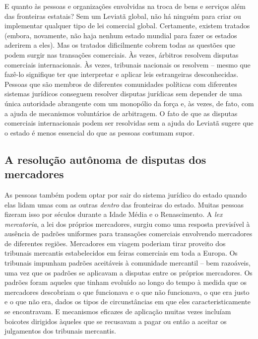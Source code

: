 E quanto às pessoas e organizações envolvidas na troca de bens e serviços além das fronteiras estatais? Sem um Leviatã global, não há ninguém para criar ou implementar qualquer tipo de lei comercial global. Certamente, existem tratados (embora, novamente, não haja nenhum estado mundial para fazer os estados aderirem a eles). Mas os tratados dificilmente cobrem todas as questões que podem surgir nas transações comerciais. Às vezes, árbitros resolvem disputas comerciais internacionais. Às vezes, tribunais nacionais os resolvem -- mesmo que fazê-lo signifique ter que interpretar e aplicar leis estrangeiras desconhecidas. Pessoas que são membros de diferentes comunidades políticas com diferentes sistemas jurídicos conseguem resolver disputas jurídicas sem depender de uma única autoridade abrangente com um monopólio da força e, às vezes, de fato, com a ajuda de mecanismos voluntários de arbitragem. O fato de que as disputas comerciais internacionais podem ser resolvidas sem a ajuda do Leviatã sugere que o estado é menos essencial do que as pessoas costumam supor.

\subsection*{A resolução autônoma de disputas dos mercadores}

As pessoas também podem optar por sair do sistema jurídico do estado quando elas lidam umas com as outras \emph{dentro} das fronteiras do estado. Muitas pessoas fizeram isso por séculos durante a Idade Média e o Renascimento. A \emph{lex mercatoria}, a lei dos próprios mercadores, surgiu como uma resposta previsível à ausência de padrões uniformes para transações comerciais envolvendo mercadores de diferentes regiões. Mercadores em viagem poderiam tirar proveito dos tribunais mercantis estabelecidos em feiras comerciais em toda a Europa. Os tribunais impunham padrões aceitáveis à comunidade mercantil -- bem razoáveis, uma vez que os padrões se aplicavam a disputas entre os próprios mercadores. Os padrões foram aqueles que tinham evoluído ao longo do tempo à medida que os mercadores descobriam o que funcionava e o que não funcionava, o que era justo e o que não era, dados os tipos de circunstâncias em que eles caracteristicamente se encontravam. E mecanismos eficazes de aplicação muitas vezes incluíam boicotes dirigidos àqueles que se recusavam a pagar ou então a aceitar os julgamentos dos tribunais mercantis.

